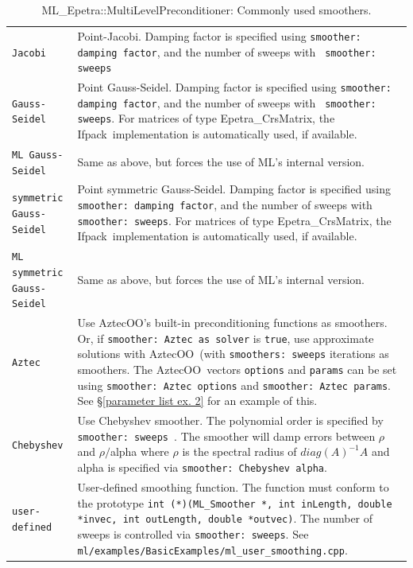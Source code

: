 \documentclass{article}[11pt]
\newcommand{\Aztecoo}  {{\sc AztecOO}}
\newcommand{\aztecoo}  {{\Aztecoo}}
\newcommand{\ifpack}  {{\sc Ifpack}}
\begin{document}
%
\begin{table}[tbh]
\begin{center}
\begin{tabular}{ | p{4.5cm} | p{10cm} | }
\hline
\verb!Jacobi! & Point-Jacobi. Damping factor is specified using
{\tt smoother: damping factor}, and the number of sweeps with {\tt
  smoother: sweeps} \\ 
\verb!Gauss-Seidel! & Point Gauss-Seidel.  Damping factor is specified using
{\tt smoother: damping factor}, and the number of sweeps with {\tt
 smoother: sweeps}.  For matrices of type Epetra\_CrsMatrix, the \ifpack\
implementation is automatically used, if available. \\
\verb!ML Gauss-Seidel! & Same as above, but forces the use of ML's internal
version.\\
\verb!symmetric Gauss-Seidel! & Point symmetric Gauss-Seidel.  Damping factor is specified using
{\tt smoother: damping factor}, and the number of sweeps with {\tt
 smoother: sweeps}.
For matrices of type Epetra\_CrsMatrix, the \ifpack\
implementation is automatically used, if available. \\
\verb!ML symmetric Gauss-Seidel! & Same as above, but forces the use of ML's
internal version.\\
\verb!Aztec! & Use \aztecoo's built-in preconditioning functions as
smoothers. Or, if {\tt smoother: Aztec as solver} is {\tt true},  use
approximate solutions with \aztecoo~(with {\tt smoothers: sweeps}
iterations as smoothers. 
The \aztecoo~vectors \verb!options! and {\tt params} can be set using
{\tt smoother: Aztec options} and {\tt smoother: Aztec params}.
See \S\ref{parameter list ex. 2} for an example of this.\\
\verb!Chebyshev! & Use Chebyshev smoother. The polynomial order is specified by {\tt
  \tt smoother: sweeps }. The smoother will damp errors between $\rho$ and $\rho/$alpha
  where $\rho$ is the spectral radius of $diag(A)^{-1} A$ and alpha is specified
  via {\tt smoother: Chebyshev alpha}.\\ 
\verb!user-defined! & User-defined smoothing function.  The function must conform to
the prototype {\tt int (*)(ML\_Smoother *, int inLength, double *invec, int outLength,
 double *outvec)}. The number of sweeps is controlled via {\tt smoother: sweeps}. See
{\tt ml/examples/BasicExamples/ml\_user\_smoothing.cpp}.\\
\hline
\end{tabular}
\caption{ML\_Epetra::MultiLevelPreconditioner: Commonly used smoothers.} 
\label{tab:ml:smoother}
\end{center}
\end{table}
\end{document}
